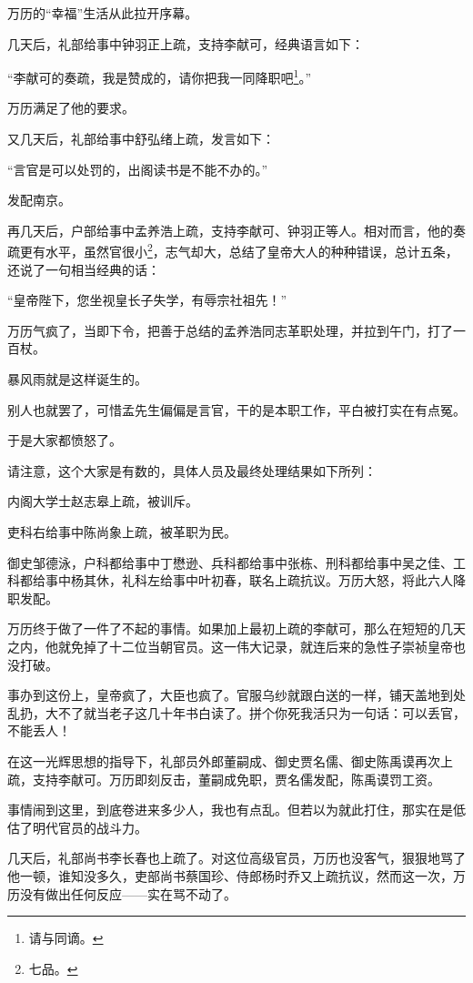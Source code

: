 \begin{multicols}{\theparacolNo}
万历的“幸福”生活从此拉开序幕。

几天后，礼部给事中钟羽正上疏，支持李献可，经典语言如下：

“李献可的奏疏，我是赞成的，请你把我一同降职吧\footnote{请与同谪。}。”

万历满足了他的要求。

又几天后，礼部给事中舒弘绪上疏，发言如下：

“言官是可以处罚的，出阁读书是不能不办的。”

发配南京。

再几天后，户部给事中孟养浩上疏，支持李献可、钟羽正等人。相对而言，他的奏疏更有水平，虽然官很小\footnote{七品。}，志气却大，总结了皇帝大人的种种错误，总计五条，还说了一句相当经典的话：

“皇帝陛下，您坐视皇长子失学，有辱宗社祖先！”

万历气疯了，当即下令，把善于总结的孟养浩同志革职处理，并拉到午门，打了一百杖。

暴风雨就是这样诞生的。

别人也就罢了，可惜孟先生偏偏是言官，干的是本职工作，平白被打实在有点冤。

于是大家都愤怒了。

请注意，这个大家是有数的，具体人员及最终处理结果如下所列：

内阁大学士赵志皋上疏，被训斥。

吏科右给事中陈尚象上疏，被革职为民。

御史邹德泳，户科都给事中丁懋逊、兵科都给事中张栋、刑科都给事中吴之佳、工科都给事中杨其休，礼科左给事中叶初春，联名上疏抗议。万历大怒，将此六人降职发配。

万历终于做了一件了不起的事情。如果加上最初上疏的李献可，那么在短短的几天之内，他就免掉了十二位当朝官员。这一伟大记录，就连后来的急性子崇祯皇帝也没打破。

事办到这份上，皇帝疯了，大臣也疯了。官服乌纱就跟白送的一样，铺天盖地到处乱扔，大不了就当老子这几十年书白读了。拼个你死我活只为一句话：可以丢官，不能丢人！

在这一光辉思想的指导下，礼部员外郎董嗣成、御史贾名儒、御史陈禹谟再次上疏，支持李献可。万历即刻反击，董嗣成免职，贾名儒发配，陈禹谟罚工资。

事情闹到这里，到底卷进来多少人，我也有点乱。但若以为就此打住，那实在是低估了明代官员的战斗力。

几天后，礼部尚书李长春也上疏了。对这位高级官员，万历也没客气，狠狠地骂了他一顿，谁知没多久，吏部尚书蔡国珍、侍郎杨时乔又上疏抗议，然而这一次，万历没有做出任何反应——实在骂不动了。


\end{multicols}
